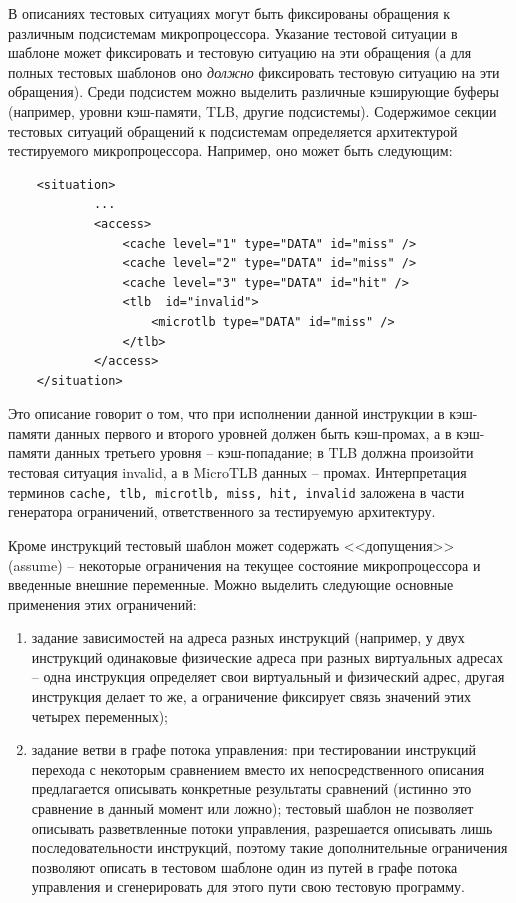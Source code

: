 В описаниях тестовых ситуациях могут быть фиксированы обращения к
различным подсистемам микропроцессора. Указание тестовой ситуации в
шаблоне может фиксировать и тестовую ситуацию на эти обращения (а
для полных тестовых шаблонов оно \emph{должно} фиксировать тестовую
ситуацию на эти обращения). Среди подсистем можно выделить различные
кэширующие буферы (например, уровни кэш-памяти, TLB, другие
подсистемы). Содержимое секции тестовых ситуаций обращений к
подсистемам определяется архитектурой тестируемого микропроцессора.
Например, оно может быть следующим: {\small
\begin{verbatim}
    <situation>
            ...
            <access>
                <cache level="1" type="DATA" id="miss" />
                <cache level="2" type="DATA" id="miss" />
                <cache level="3" type="DATA" id="hit" />
                <tlb  id="invalid">
                    <microtlb type="DATA" id="miss" />
                </tlb>
            </access>
    </situation>
\end{verbatim}}

Это описание говорит о том, что при исполнении данной инструкции в
кэш-памяти данных первого и второго уровней должен быть кэш-промах,
а в кэш-памяти данных третьего уровня -- кэш-попадание; в TLB должна
произойти тестовая ситуация invalid, а в MicroTLB данных -- промах.
Интерпретация терминов \texttt{cache, tlb, microtlb, miss, hit,
invalid} заложена в части генератора ограничений, ответственного за
тестируемую архитектуру.

Кроме инструкций тестовый шаблон может содержать <<допущения>>
(assume) -- некоторые ограничения на текущее состояние
микропроцессора и введенные внешние переменные. Можно выделить
следующие основные применения этих ограничений:
\begin{enumerate}
\item задание зависимостей на адреса разных инструкций (например, у
двух инструкций одинаковые физические адреса при разных виртуальных
адресах -- одна инструкция определяет свои виртуальный и физический
адрес, другая инструкция делает то же, а ограничение фиксирует связь
значений этих четырех переменных);
\item задание ветви в графе потока управления: при тестировании
инструкций перехода с некоторым сравнением вместо их
непосредственного описания предлагается описывать конкретные
результаты сравнений (истинно это сравнение в данный момент или
ложно); тестовый шаблон не позволяет описывать разветвленные потоки
управления, разрешается описывать лишь последовательности
инструкций, поэтому такие дополнительные ограничения позволяют
описать в тестовом шаблоне один из путей в графе потока управления и
сгенерировать для этого пути свою тестовую программу.
\end{enumerate}

